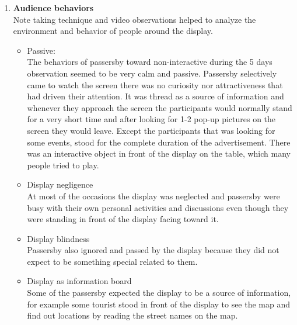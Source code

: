 \begin{enumerate}
\begin{enumerate}
\end{enumerate}


\item \textbf{Audience behaviors} \\
Note taking technique and video observations helped to analyze the environment and behavior of people around the display. 

\begin{itemize}

\item Passive: \\
The behaviors of passersby toward non-interactive during the 5 days observation seemed to be very calm and passive. Passersby selectively came to watch the screen there was no curiosity nor attractiveness that had driven their attention. It was thread as a source of information and whenever they approach the screen the participants would normally stand for a very short time and after looking for 1-2 pop-up pictures on the screen they would leave. Except the participants that was looking for some events, stood for the complete duration of the advertisement. There was an interactive object in front of the display on the table, which many people tried to play.


\item Display negligence  \\
At most of the occasions the display was neglected and passersby were busy with their own personal activities and discussions even though they were standing in front of the display facing toward it.

\item Display blindness \\
Passersby also ignored and passed by the display because they did not expect to be something special related to them.

\item Display as information board \\
Some of the passersby expected the display to be a source of information, for example some tourist stood in front of the display to see the map and find out locations by reading the street names on the map.

\end{itemize}


\end{enumerate}

